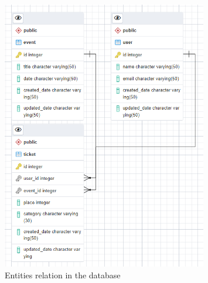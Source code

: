 \begin{figure}[h]
    \centering
    \includegraphics[width=0.8\textwidth]{images/database_relations}
    \caption{Entities relation in the database}
    \label{fig:db_relations}
\end{figure}
